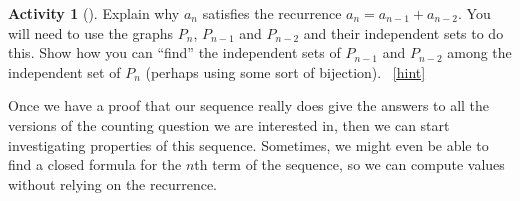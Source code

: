 \documentclass[10pt,]{book}
\theoremstyle{plain}
\theoremstyle{definition}
\theoremstyle{definition}
\theoremstyle{definition}
\newtheorem{activity}[project]{Activity}
\numberwithin{equation}{chapter}
\begin{document}
\begin{activity}[]\label{activity-71}
\hypertarget{p-457}{}%
Explain why \(a_n\) satisfies the recurrence \(a_n = a_{n-1} + a_{n-2}\).  You will need to use the graphs \(P_n\), \(P_{n-1}\) and \(P_{n-2}\) and their independent sets to do this.  Show how you can ``find'' the independent sets of \(P_{n-1}\) and \(P_{n-2}\) among the independent set of \(P_{n}\) (perhaps using some sort of bijection).%
~\hfill{\tiny\hyperlink{a-71}{[hint]}\hypertarget{q-71}{}}\end{activity}
\hypertarget{p-459}{}%
Once we have a proof that our sequence really does give the answers to all the versions of the counting question we are interested in, then  we can start investigating properties of this sequence.  Sometimes, we might even be able to find a closed formula for the \(n\)th term of the sequence, so we can compute values without relying on the recurrence.%
\typeout{************************************************}
\typeout{************************************************}
\end{document}
